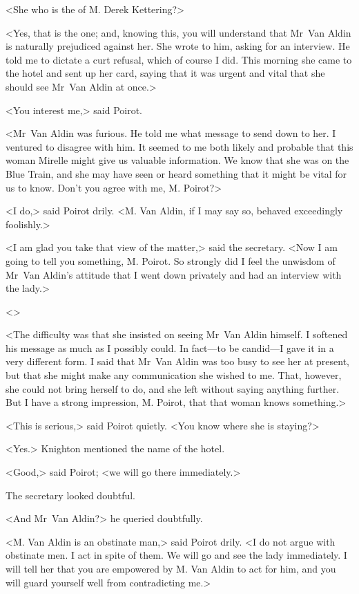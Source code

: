 <She who is the  of M. Derek Kettering?>

<Yes, that is the one; and, knowing this, you will understand that Mr~Van Aldin is naturally prejudiced against her. She wrote to him, asking for an interview. He told me to dictate a curt refusal, which of course I did. This morning she came to the hotel and sent up her card, saying that it was urgent and vital that she should see Mr~Van Aldin at once.>

<You interest me,> said Poirot.

<Mr~Van Aldin was furious. He told me what message to send down to her. I ventured to disagree with him. It seemed to me both likely and probable that this woman Mirelle might give us valuable information. We know that she was on the Blue Train, and she may have seen or heard something that it might be vital for us to know. Don't you agree with me, M. Poirot?>

<I do,> said Poirot drily. <M. Van Aldin, if I may say so, behaved exceedingly foolishly.>

<I am glad you take that view of the matter,> said the secretary. <Now I am going to tell you something, M. Poirot. So strongly did I feel the unwisdom of Mr~Van Aldin's attitude that I went down privately and had an interview with the lady.>

<>

<The difficulty was that she insisted on seeing Mr~Van Aldin himself. I softened his message as much as I possibly could. In fact—to be candid—I gave it in a very different form. I said that Mr~Van Aldin was too busy to see her at present, but that she might make any communication she wished to me. That, however, she could not bring herself to do, and she left without saying anything further. But I have a strong impression, M. Poirot, that that woman knows something.>

<This is serious,> said Poirot quietly. <You know where she is staying?>

<Yes.> Knighton mentioned the name of the hotel.

<Good,> said Poirot; <we will go there immediately.>

The secretary looked doubtful.

<And Mr~Van Aldin?> he queried doubtfully.

<M. Van Aldin is an obstinate man,> said Poirot drily. <I do not argue with obstinate men. I act in spite of them. We will go and see the lady immediately. I will tell her that you are empowered by M. Van Aldin to act for him, and you will guard yourself well from contradicting me.>

